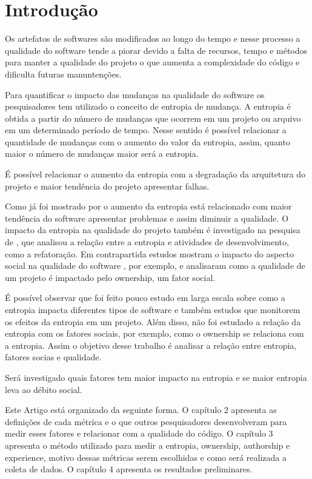 \chapter{Introdução}

Os artefatos de softwares são modificados ao longo do tempo e nesse processo a qualidade do software tende a piorar devido a falta de recursos, tempo e métodos para manter a qualidade do projeto o que aumenta a complexidade do código e dificulta futuras manuntenções.

Para quantificar o impacto das mudanças na qualidade do software os pesquisadores tem utilizado o conceito de entropia de mudança. A entropia é obtida a partir do número de mudanças que ocorrem em um projeto ou arquivo em um determinado período de tempo. Nesse sentido é possível relacionar a quantidade de mudanças com o aumento do valor da entropia, assim, quanto maior o número de mudanças maior será a entropia.

É possível relacionar o aumento da entropia com a degradação da arquitetura do projeto e maior tendência do projeto apresentar falhas.

Como já foi mostrado por  o aumento da entropia está relacionado com maior tendência do software apresentar problemas e assim diminuir a qualidade. O impacto da entropia na qualidade do projeto também é investigado na pesquisa de , que analisou a relação entre a entropia e atividades de desenvolvimento, como a refatoração. Em contrapartida estudos mostram o impacto do aspecto social na qualidade do software , por exemplo,  e  analisaram como a qualidade de um projeto é impactado pelo ownership, um fator social. 

É possível observar que foi feito pouco estudo em larga escala sobre como a entropia impacta diferentes tipos de software e também estudos que monitorem os efeitos da entropia em um projeto. Além disso, não foi estudado a relação da entropia com os fatores sociais, por exemplo, como o ownership se relaciona com a entropia. Assim o objetivo desse trabalho é analisar a relação entre entropia, fatores socias e qualidade.

Será investigado quais fatores tem maior impacto na entropia e se maior entropia leva ao débito social.

Este Artigo está organizado da seguinte forma. O capítulo 2 apresenta as definições de cada métrica e o que outros pesquisadores desenvolveram para medir esses fatores e relacionar com a qualidade do código. O capítulo 3 apresenta o método utilizado para medir a entropia, ownership, authorship e experience, motivo dessas métricas serem escolhidas e como será realizada a coleta de dados. O capítulo 4 apresenta os resultados preliminares.